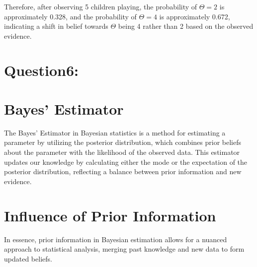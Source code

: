 \documentclass{article}
\begin{document}
Therefore, after observing 5 children playing, the probability of $\Theta = 2$ is approximately 0.328, and the probability of $\Theta = 4$ is approximately 0.672, indicating a shift in belief towards $\Theta$ being 4 rather than 2 based on the observed evidence.

\section*{Question6:}
\section{Bayes' Estimator}

The Bayes' Estimator in Bayesian statistics is a method for estimating a parameter by utilizing the posterior distribution, which combines prior beliefs about the parameter with the likelihood of the observed data. This estimator updates our knowledge by calculating either the mode or the expectation of the posterior distribution, reflecting a balance between prior information and new evidence.

\section{Influence of Prior Information}

In essence, prior information in Bayesian estimation allows for a nuanced approach to statistical analysis, merging past knowledge and new data to form updated beliefs.
\end{document}
